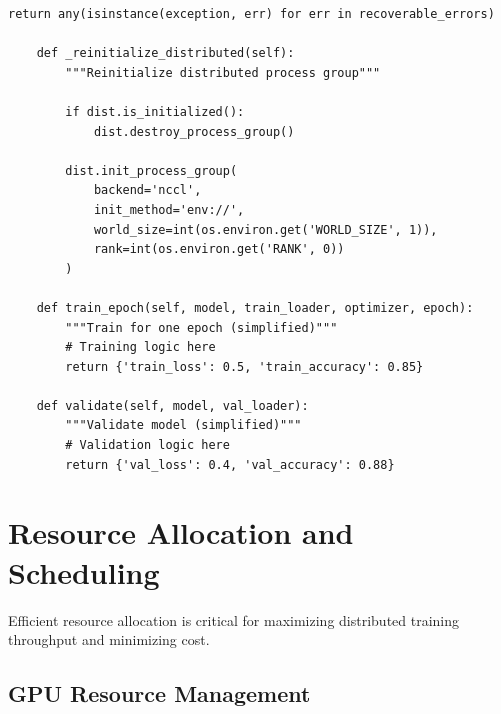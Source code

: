 \begin{lstlisting}[style=python, caption=Robust Checkpointing for Distributed Training]
        return any(isinstance(exception, err) for err in recoverable_errors)

    def _reinitialize_distributed(self):
        """Reinitialize distributed process group"""

        if dist.is_initialized():
            dist.destroy_process_group()

        dist.init_process_group(
            backend='nccl',
            init_method='env://',
            world_size=int(os.environ.get('WORLD_SIZE', 1)),
            rank=int(os.environ.get('RANK', 0))
        )

    def train_epoch(self, model, train_loader, optimizer, epoch):
        """Train for one epoch (simplified)"""
        # Training logic here
        return {'train_loss': 0.5, 'train_accuracy': 0.85}

    def validate(self, model, val_loader):
        """Validate model (simplified)"""
        # Validation logic here
        return {'val_loss': 0.4, 'val_accuracy': 0.88}
\end{lstlisting}

\section{Resource Allocation and Scheduling}

Efficient resource allocation is critical for maximizing distributed training throughput and minimizing cost.

\subsection{GPU Resource Management}

